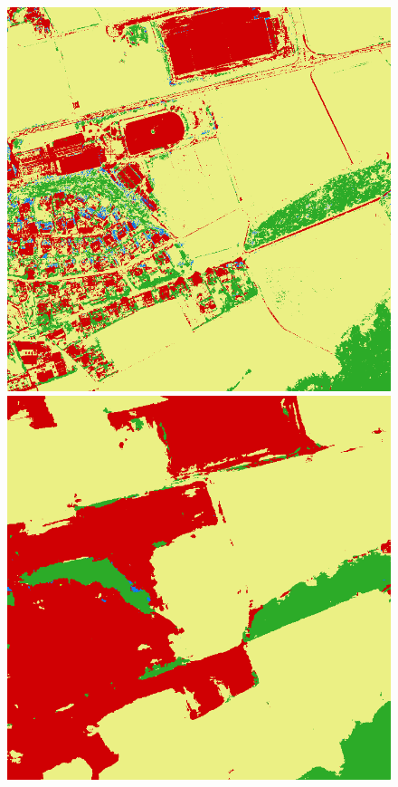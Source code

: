 \begin{figure}
    \includegraphics[width=\DiscussionImageWidth]{images/segmentation_discussion/densenet/1.png} \hfill
    \includegraphics[width=\DiscussionImageWidth]{images/segmentation_discussion/unet/1.png}


\end{figure}
